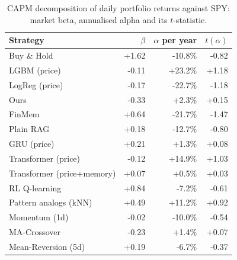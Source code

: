 \begin{table}[H]
\centering
\small
\caption{CAPM decomposition of daily portfolio returns against SPY: market beta, annualised alpha and its $t$-statistic.}
\label{tab:ext-capm}
\begin{tabular}{lrrr}
\toprule
Strategy & $\beta$ & $\alpha$ per year & $t(\alpha)$ \\
\midrule
Buy \& Hold & +1.62 & -10.8\% & -0.82 \\
LGBM (price) & -0.11 & +23.2\% & +1.18 \\
LogReg (price) & -0.17 & -22.7\% & -1.18 \\
Ours & -0.33 & +2.3\% & +0.15 \\
FinMem & +0.64 & -21.7\% & -1.47 \\
Plain RAG & +0.18 & -12.7\% & -0.80 \\
GRU (price) & +0.21 & +1.3\% & +0.08 \\
Transformer (price) & -0.12 & +14.9\% & +1.03 \\
Transformer (price+memory) & +0.07 & +0.5\% & +0.03 \\
RL Q-learning & +0.84 & -7.2\% & -0.61 \\
Pattern analogs (kNN) & +0.49 & +11.2\% & +0.92 \\
Momentum (1d) & -0.02 & -10.0\% & -0.54 \\
MA-Crossover & -0.23 & +1.4\% & +0.07 \\
Mean-Reversion (5d) & +0.19 & -6.7\% & -0.37 \\
\bottomrule
\end{tabular}
\end{table}
